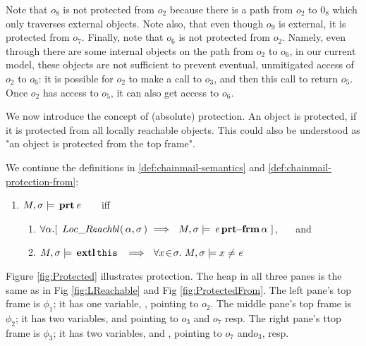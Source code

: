 { 

Note that $o_8$ is not protected from $o_2$ because there is a path from $o_2$ to $0_8$ which only traverses external objects. Note also, that even though $o_9$ is external, it is protected from $o_7$.
Finally, note that $o_6$ is not protected from $o_2$. 
Namely, even through there are some internal objects on the path from $o_2$ to $o_6$, in our current model, these objects are not sufficient to prevent eventual, unmitigated access of $o_2$ to $o_6$: it is possible for $o_2$ to make a call to $o_3$, and then this call to return $o_5$. Once $o_2$ has access to $o_5$, it can also get access to $o_6$. 

\vspace{.1in}

We now introduce the concept of (absolute) protection.
An object is protected, if it is protected from all locally reachable objects. This could also be understood as 
"an object is protected from the top frame". 
 
\begin{definition} 
\label{def:chainmail-protection}
\label{sect:semantics:assert:prt}
We continue the definitions in \ref{def:chainmail-semantics} and \ref{def:chainmail-protection-from}:
\begin{enumerate}
\item
$M , \sigma \models {\ensuremath{\, \mathbf{prt}}\, \mathit{e}\, }$  \ \ \ iff \ \ \ 
\begin{enumerate}
\item
{$\forall \alpha.[ \  \LRelevant {\alpha}  {\sigma}\ \Longrightarrow \ \  \satisfiesA{M}{\sigma}{\protectedFrom{\re} {{\alpha}}}\ ] $}, \ \ \ and 
\item
$\satisfiesA{M}{\sigma}{\external{\prg{this}}}\ \ \Longrightarrow\ \ \forall x\!\in\! \sigma.\ \satisfiesA{M}{\sigma}{x\neq \re}$
\end{enumerate}
\end{enumerate}
\end{definition} 
 
  Figure \ref{fig:Protected} illustrates %
  protection. The heap in all three panes is the same as in  Fig \ref{fig:LReachable} and 
 Fig \ref{fig:ProtectedFrom}. The left pane's  top frame is $\phi_1$; it has  one variable, , pointing to $o_2$.  The middle pane's  top frame is $\phi_2$; it has two  variables,    and  pointing to $o_3$ and  $o_7$ resp. The right pane's  ttop frame is $\phi_3$; it has two  variables,   and , pointing to $o_7$ and$o_3$, resp.  

}

